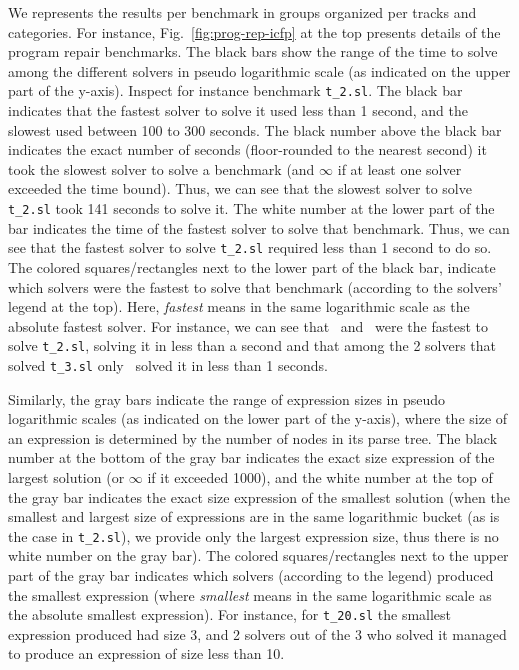 We represents the results per benchmark in groups organized per tracks and categories. For instance, Fig.~\ref{fig:prog-rep-icfp} at the top presents details of the program repair benchmarks. The black bars show the range of the time to solve among the different solvers in pseudo logarithmic scale (as indicated on the upper part of the y-axis). Inspect for instance benchmark \texttt{t\_2.sl}. The black bar indicates that the fastest solver to solve it used less than 1 second, and the slowest used between 100 to 300 seconds. 
The black number above the black bar indicates the exact number of seconds (floor-rounded to the nearest second) it took the slowest solver to solve a benchmark (and $\infty$ if at least one solver exceeded the time bound). Thus, we can see that the slowest solver to solve \texttt{t\_2.sl} took 141 seconds to solve it. The white number at the lower part of the bar indicates the time of the fastest solver to solve that benchmark. Thus, we can see that the fastest solver to solve \texttt{t\_2.sl} required less than 1 second to do so. The colored squares/rectangles next to the lower part of the black bar, indicate which solvers were the fastest to solve that benchmark (according to the solvers' legend at the top). Here, \emph{fastest} means in the same logarithmic scale as the absolute fastest solver. For instance, we can see that \euphony\ and \eusolvernew\ were the fastest to solve \texttt{t\_2.sl}, solving it in less than a second
and that among the 2 solvers that solved \texttt{t\_3.sl} only \eusolvernew\ solved it in less than 1 seconds. 

Similarly, the gray bars indicate the range of expression sizes in pseudo logarithmic scales (as indicated on the lower part of the y-axis), where the size of an expression is determined by the number of nodes in its parse tree.
The black number at the bottom of the gray bar indicates the exact size expression of the largest solution (or $\infty$ if it exceeded 1000), and the white number at the top of the gray bar indicates the exact size expression of the smallest solution (when the smallest and largest size of expressions are in the same logarithmic bucket (as is the case in \texttt{t\_2.sl}), we provide only the largest expression size, thus there is no white number on the gray bar). The colored squares/rectangles next to the upper part of the gray bar indicates which solvers (according to the legend) produced the smallest expression (where \emph{smallest} means in the same logarithmic scale as the absolute smallest expression). For instance, for \texttt{t\_20.sl} the smallest expression produced had size 3, and 2 solvers out of the 3 who solved it managed to produce an expression of size less than 10.  

